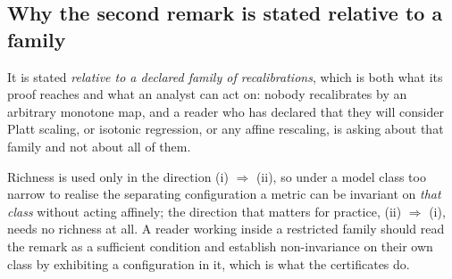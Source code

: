 \subsection*{Why the second remark is stated relative to a family}


It is stated \emph{relative to a declared family of recalibrations}, which is
both what its proof reaches and what an analyst can act on: nobody
recalibrates by an arbitrary monotone map, and a reader who has declared
that they will consider Platt scaling, or isotonic regression, or any affine
rescaling, is asking about that family and not about all of them.

Richness is used only in the direction (i) $\Rightarrow$ (ii), so under a
model class too narrow to realise the separating configuration a metric
can be invariant on \emph{that class} without acting affinely; the direction
that matters for practice, (ii) $\Rightarrow$ (i), needs no richness at all.
A reader working inside a restricted family should read the remark as a
sufficient condition and establish non-invariance on their own class by
exhibiting a configuration in it, which is what the certificates do.
